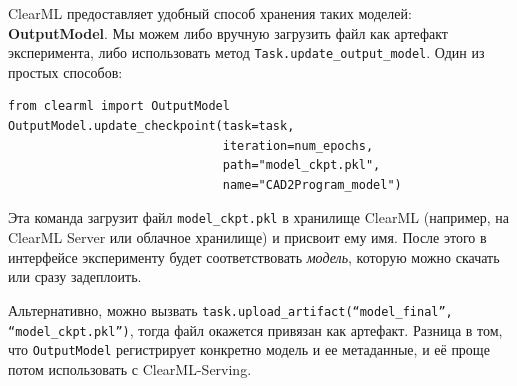 \documentclass{article}
\begin{document}
ClearML предоставляет удобный способ хранения таких моделей: \textbf{OutputModel}. Мы можем либо вручную загрузить файл как артефакт эксперимента, либо использовать метод \texttt{Task.update_output_model}. Один из простых способов:
\begin{lstlisting}
from clearml import OutputModel
OutputModel.update_checkpoint(task=task,
                              iteration=num_epochs,
                              path="model_ckpt.pkl",
                              name="CAD2Program_model")
\end{lstlisting}
Эта команда загрузит файл \texttt{model_ckpt.pkl} в хранилище ClearML (например, на ClearML Server или облачное хранилище) и присвоит ему имя. После этого в интерфейсе эксперименту будет соответствовать \emph{модель}, которую можно скачать или сразу задеплоить.

Альтернативно, можно вызвать \texttt{task.upload_artifact(“model_final”, “model_ckpt.pkl”)}, тогда файл окажется привязан как артефакт. Разница в том, что \texttt{OutputModel} регистрирует конкретно модель и ее метаданные, и её проще потом использовать с ClearML-Serving.
\end{document}
